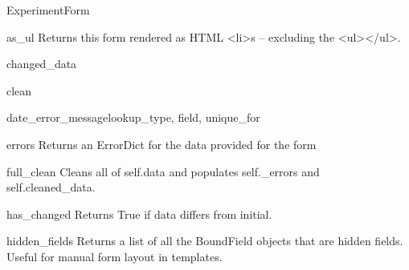 \documentclass[letterpaper,10pt,english]{sphinxmanual}
\begin{document}
\begin{classdesc}{ExperimentForm}
\hypertarget{data.forms.ExperimentForm.as_ul}{}\begin{methoddesc}[ExperimentForm]{as\_ul}{}
Returns this form rendered as HTML \textless{}li\textgreater{}s -- excluding the \textless{}ul\textgreater{}\textless{}/ul\textgreater{}.
\end{methoddesc}

\hypertarget{data.forms.ExperimentForm.changed_data}{}\begin{memberdesc}[ExperimentForm]{changed\_data}\end{memberdesc}

\hypertarget{data.forms.ExperimentForm.clean}{}\begin{methoddesc}[ExperimentForm]{clean}{}\end{methoddesc}

\hypertarget{data.forms.ExperimentForm.date_error_message}{}\begin{methoddesc}[ExperimentForm]{date\_error\_message}{lookup\_type, field, unique\_for}\end{methoddesc}

\hypertarget{data.forms.ExperimentForm.errors}{}\begin{memberdesc}[ExperimentForm]{errors}
Returns an ErrorDict for the data provided for the form
\end{memberdesc}

\hypertarget{data.forms.ExperimentForm.full_clean}{}\begin{methoddesc}[ExperimentForm]{full\_clean}{}
Cleans all of self.data and populates self.\_errors and
self.cleaned\_data.
\end{methoddesc}

\hypertarget{data.forms.ExperimentForm.has_changed}{}\begin{methoddesc}[ExperimentForm]{has\_changed}{}
Returns True if data differs from initial.
\end{methoddesc}

\hypertarget{data.forms.ExperimentForm.hidden_fields}{}\begin{methoddesc}[ExperimentForm]{hidden\_fields}{}
Returns a list of all the BoundField objects that are hidden fields.
Useful for manual form layout in templates.
\end{methoddesc}


\end{classdesc}
\end{document}
